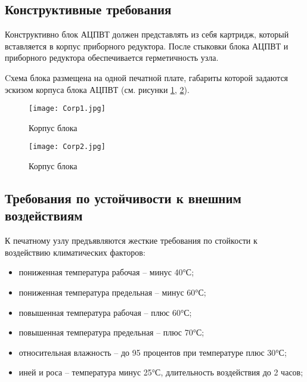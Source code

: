 \subsection{Конструктивные требования}

    Конструктивно блок АЦПВТ должен представлять из себя картридж, который вставляется в корпус приборного редуктора. 
    После стыковки блока АЦПВТ и приборного редуктора обеспечивается герметичность узла. 

    Cхема блока размещена на одной печатной плате, габариты которой задаются эскизом корпуса блока АЦПВТ (см. рисунки \ref{Corp1}, \ref{Corp2}). 

    \begin{figure}[!t]
      \centering
      \texttt{[image: Corp1.jpg]} 
      \caption{Корпус блока}
      \label{Corp1}
    \end{figure}

    \begin{figure}[!t]
      \centering
      \texttt{[image: Corp2.jpg]} 
      \caption{Корпус блока}
      \label{Corp2}
    \end{figure}

\subsection{Требования по устойчивости к внешним воздействиям}
  К печатному узлу предъявляются жесткие требования по стойкости к воздействию климатических факторов:
\begin{itemize}

  \item пониженная температура рабочая – минус 40°С;

  \item пониженная температура предельная – минус 60°С;

 \item повышенная температура рабочая – плюс 60°С;

 \item повышенная температура предельная – плюс 70°С;

 \item относительная влажность – до 95 процентов при температуре плюс 30°С;

 \item иней и роса – температура минус 25°С, длительность воздействия до 2 часов;
 
\end{itemize}


